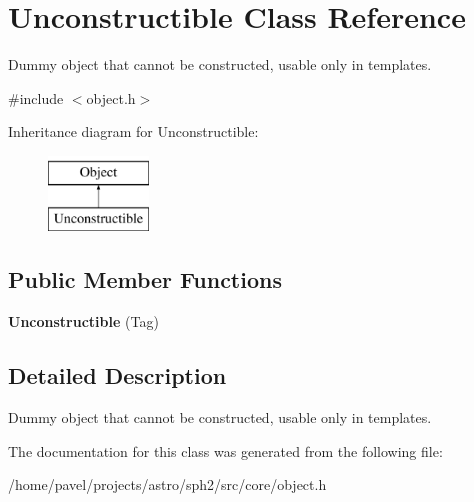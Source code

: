 \hypertarget{classUnconstructible}{}\section{Unconstructible Class Reference}
\label{classUnconstructible}


Dummy object that cannot be constructed, usable only in templates.  




{\ttfamily \#include $<$object.\+h$>$}

Inheritance diagram for Unconstructible\+:\begin{figure}[H]
\begin{center}
\leavevmode
\includegraphics[height=2.000000cm]{classUnconstructible}
\end{center}
\end{figure}
\subsection*{Public Member Functions}
\begin{DoxyCompactItemize}
\item 
\hypertarget{classUnconstructible_a2636f397a0166b79fdbb15180e72cb5b}{}\label{classUnconstructible_a2636f397a0166b79fdbb15180e72cb5b} 
{\bfseries Unconstructible} (Tag)
\end{DoxyCompactItemize}


\subsection{Detailed Description}
Dummy object that cannot be constructed, usable only in templates. 

The documentation for this class was generated from the following file\+:\begin{DoxyCompactItemize}
\item 
/home/pavel/projects/astro/sph2/src/core/object.\+h\end{DoxyCompactItemize}
